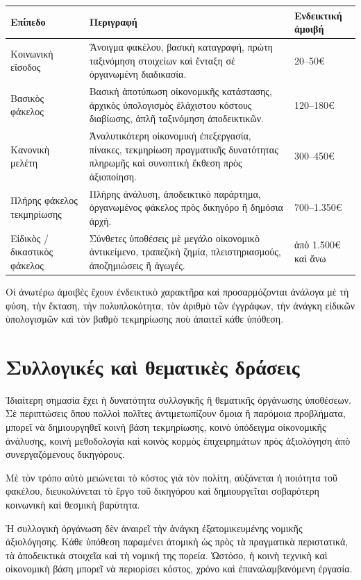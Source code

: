 \documentclass[12pt,a4paper]{article}
\begin{document}
	\begin{longtable}{p{} p{} p{}} 
		\toprule 
		\textbf{Επίπεδο} & \textbf{Περιγραφή} & \textbf{Ενδεικτική ἀμοιβή} \\ 
		\midrule 
		Κοινωνικὴ εἴσοδος & Ἄνοιγμα φακέλου, βασικὴ καταγραφή, πρώτη ταξινόμηση στοιχείων καὶ ἔνταξη σὲ ὀργανωμένη διαδικασία. & 20--50€ \\ 
		\addlinespace 
		Βασικὸς φάκελος & Βασικὴ ἀποτύπωση οἰκονομικῆς κατάστασης, ἀρχικὸς ὑπολογισμὸς ἐλάχιστου κόστους διαβίωσης, ἁπλῆ ταξινόμηση ἀποδεικτικῶν. & 120--180€ \\ 
		\addlinespace 
		Κανονικὴ μελέτη & Ἀναλυτικότερη οἰκονομικὴ ἐπεξεργασία, πίνακες, τεκμηρίωση πραγματικῆς δυνατότητας πληρωμῆς καὶ συνοπτικὴ ἔκθεση πρὸς ἀξιοποίηση. & 300--450€ \\ 
		\addlinespace 
		Πλήρης φάκελος τεκμηρίωσης & Πλήρης ἀνάλυση, ἀποδεικτικὸ παράρτημα, ὀργανωμένος φάκελος πρὸς δικηγόρο ἢ δημόσια ἀρχή. & 700--1.350€ \\
		\addlinespace 
		Εἰδικὸς / δικαστικὸς φάκελος & Σύνθετες ὑποθέσεις μὲ μεγάλο οἰκονομικὸ ἀντικείμενο, τραπεζικὴ ζημία, πλειστηριασμούς, ἀποζημιώσεις ἢ ἀγωγές. & ἀπὸ 1.500€ καὶ ἄνω \\ 
		\bottomrule 
	\end{longtable} 
	
Οἱ ἀνωτέρω ἀμοιβὲς ἔχουν ἐνδεικτικὸ χαρακτῆρα καὶ προσαρμόζονται ἀνάλογα μὲ τὴ φύση, τὴν ἔκταση, τὴν πολυπλοκότητα, τὸν ἀριθμὸ τῶν ἐγγράφων, τὴν ἀνάγκη εἰδικῶν ὑπολογισμῶν καὶ τὸν βαθμὸ τεκμηρίωσης ποὺ ἀπαιτεῖ κάθε ὑπόθεση. 

\section{Συλλογικές καὶ θεματικὲς δράσεις} 

Ἰδιαίτερη σημασία ἔχει ἡ δυνατότητα συλλογικῆς ἢ θεματικῆς ὀργάνωσης ὑποθέσεων. Σὲ περιπτώσεις ὅπου πολλοὶ πολῖτες ἀντιμετωπίζουν ὅμοια ἢ παρόμοια προβλήματα, μπορεῖ νὰ δημιουργηθεῖ κοινὴ βάση τεκμηρίωσης, κοινὸ ὑπόδειγμα οἰκονομικῆς ἀνάλυσης, κοινὴ μεθοδολογία καὶ κοινὸς κορμὸς ἐπιχειρημάτων πρὸς ἀξιολόγηση ἀπὸ συνεργαζόμενους δικηγόρους. 

Μὲ τὸν τρόπο αὐτὸ μειώνεται τὸ κόστος γιὰ τὸν πολίτη, αὐξάνεται ἡ ποιότητα τοῦ φακέλου, διευκολύνεται τὸ ἔργο τοῦ δικηγόρου καὶ δημιουργεῖται σοβαρότερη κοινωνικὴ καὶ θεσμικὴ βαρύτητα. 

Ἡ συλλογικὴ ὀργάνωση δὲν ἀναιρεῖ τὴν ἀνάγκη ἐξατομικευμένης νομικῆς ἀξιολόγησης. Κάθε ὑπόθεση παραμένει ἀτομικὴ ὡς πρὸς τὰ πραγματικὰ περιστατικά, τὰ ἀποδεικτικὰ στοιχεῖα καὶ τὴ νομική της πορεία. Ὡστόσο, ἡ κοινὴ τεχνικὴ καὶ οἰκονομικὴ βάση μπορεῖ νὰ περιορίσει κόστος, χρόνο καὶ ἐπαναλαμβανόμενη ἐργασία. 
\end{document}
